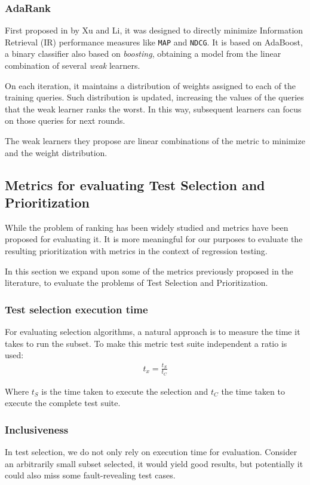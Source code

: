\subsubsection{AdaRank}

First proposed in \cite{xuliadarank} by Xu and Li, it was designed to directly minimize Information Retrieval (IR) performance measures
like \texttt{MAP} and \texttt{NDCG}. It is based on AdaBoost, a binary classifier also based on \emph{boosting},
obtaining a model from the linear combination of several \emph{weak} learners.

On each iteration, it maintains a distribution of weights assigned to each of the training queries.
Such distribution is updated, increasing the values of the queries that the weak learner ranks the worst.
In this way, subsequent learners can focus on those queries for next rounds.

The weak learners they propose are linear combinations of the metric to minimize and the weight distribution.

\subsection{Metrics for evaluating Test Selection and Prioritization}
\label{sec:bg-metrics-tsp}

While the problem of ranking has been widely studied and metrics have been proposed for evaluating it. It is more
meaningful for our purposes to evaluate the resulting prioritization with metrics in the context of regression testing.

In this section we expand upon some of the metrics previously proposed in the literature, to evaluate the problems of Test Selection
and Prioritization.

\subsubsection{Test selection execution time}
For evaluating selection algorithms, a natural approach is to measure the time it takes to run the subset. To make 
this metric test suite independent a ratio is used:
\begin{align*}
    t_x = \frac{t_S}{t_C}
\end{align*}

Where $t_S$ is the time taken to execute the selection and $t_C$ the time taken to execute the complete test suite.

\subsubsection{Inclusiveness}
In test selection, we do not only rely on execution time for evaluation. Consider an arbitrarily small subset selected, it would yield good results,
but potentially it could also miss some fault-revealing test cases.

